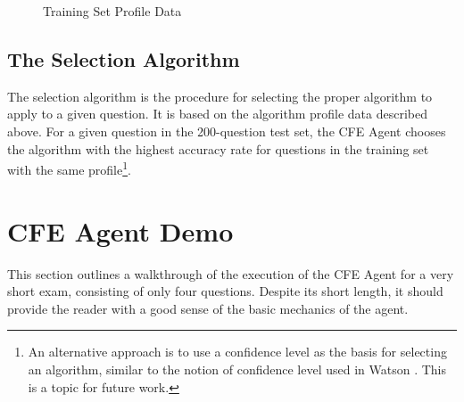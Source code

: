 \begin{figure}
\centering
\vspace{2.0in}
\caption{Training Set Profile Data}
\label{fig:profile_data_training_set}
\end{figure}

\subsection{The Selection Algorithm}

The selection algorithm is the procedure for selecting the proper algorithm to apply to a given question.  It is based on the algorithm profile data described above.  For a given question in the 200-question test set, the CFE Agent chooses the algorithm with the highest accuracy rate for questions in the training set with the same profile\footnote{An alternative approach is to use a confidence level as the basis for selecting an algorithm, similar to the notion of confidence level used in Watson \cite{ferrucci2010building}.  This is a topic for future work.}.

\section{CFE Agent Demo}

This section outlines a walkthrough of the execution of the CFE Agent for a very short exam, consisting of only four questions.  Despite its short length, it should provide the reader with a good sense of the basic mechanics of the agent.  

